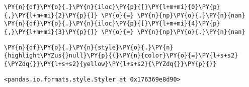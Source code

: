     \begin{tcolorbox}[breakable, size=fbox, boxrule=1pt, pad at break*=1mm,colback=cellbackground, colframe=cellborder]
\begin{Verbatim}[commandchars=\\\{\}]
\PY{n}{df}\PY{o}{.}\PY{n}{iloc}\PY{p}{[}\PY{l+m+mi}{0}\PY{p}{,}\PY{l+m+mi}{2}\PY{p}{]} \PY{o}{=} \PY{n}{np}\PY{o}{.}\PY{n}{nan}
\PY{n}{df}\PY{o}{.}\PY{n}{iloc}\PY{p}{[}\PY{l+m+mi}{4}\PY{p}{,}\PY{l+m+mi}{3}\PY{p}{]} \PY{o}{=} \PY{n}{np}\PY{o}{.}\PY{n}{nan}
\end{Verbatim}
\end{tcolorbox}

    \begin{tcolorbox}[breakable, size=fbox, boxrule=1pt, pad at break*=1mm,colback=cellbackground, colframe=cellborder]
\begin{Verbatim}[commandchars=\\\{\}]
\PY{n}{df}\PY{o}{.}\PY{n}{style}\PY{o}{.}\PY{n}{highlight\PYZus{}null}\PY{p}{(}\PY{n}{color}\PY{o}{=}\PY{l+s+s2}{\PYZdq{}}\PY{l+s+s2}{yellow}\PY{l+s+s2}{\PYZdq{}}\PY{p}{)}
\end{Verbatim}
\end{tcolorbox}

            \begin{tcolorbox}[breakable, size=fbox, boxrule=.5pt, pad at break*=1mm, opacityfill=0]
\begin{Verbatim}[commandchars=\\\{\}]
<pandas.io.formats.style.Styler at 0x176369e8d90>
\end{Verbatim}
\end{tcolorbox}
